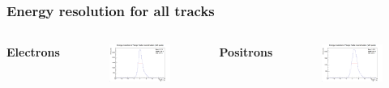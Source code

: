 \documentclass{beamer}
\begin{document}
	\begin{frame}
		\frametitle{Energy resolution for all tracks}
		\begin{columns}
			\centering
			\Large \textbf{Electrons}
			\begin{figure}
				\centering
				\includegraphics[width = 0.95 \linewidth]{../images/e_delta_energy_all.png}
			\end{figure}
			\centering
			\Large \textbf{Positrons}
			\begin{figure}
				\centering
				\includegraphics[width = 0.95 \linewidth]{../images/p_delta_energy_all.png}
			\end{figure}
		\end{columns}
	\end{frame}
\end{document}
